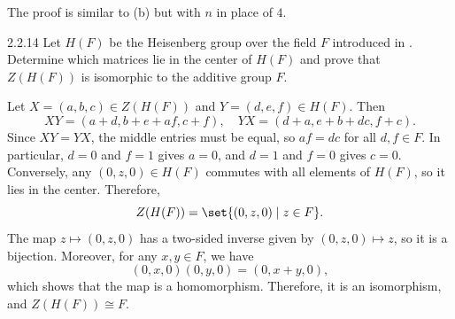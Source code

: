 \begin{sol}
    The proof is similar to (b) but with $n$ in place of $4$.
\end{sol}

\begin{exercise}{2.2.14}
    Let $H(F)$ be the Heisenberg group over the field $F$ introduced in .
	Determine which matrices lie in the center of $H(F)$ and prove that $Z(H(F))$ is isomorphic to the additive group $F$.
\end{exercise}

\begin{sol}
    Let $X = (a, b, c) \in Z(H(F))$ and $Y = (d, e, f) \in H(F)$.
	Then
    \[
        XY = (a + d, b + e + af, c + f), \quad
        YX = (d + a, e + b + dc, f + c).
    \]
    Since $XY = YX$, the middle entries must be equal, so $af = dc$ for all $d, f \in F$.
    In particular, $d = 0$ and $f = 1$ gives $a = 0$, and $d = 1$ and $f = 0$ gives $c = 0$.
	Conversely, any $(0, z, 0) \in H(F)$ commutes with all elements of $H(F)$, so it lies in the center.
    Therefore,
    \[
    	Z(H(F)) = \set{(0, z, 0) \mid z \in F}.
    \]
    The map $z \mapsto (0, z, 0)$ has a two-sided inverse given by $(0, z, 0) \mapsto z$, so it is a bijection.
    Moreover, for any $x, y \in F$, we have
    \[
        (0, x, 0)(0, y, 0) = (0, x + y, 0),
    \]
    which shows that the map is a homomorphism.
    Therefore, it is an isomorphism, and $Z(H(F)) \cong F$.
\end{sol}